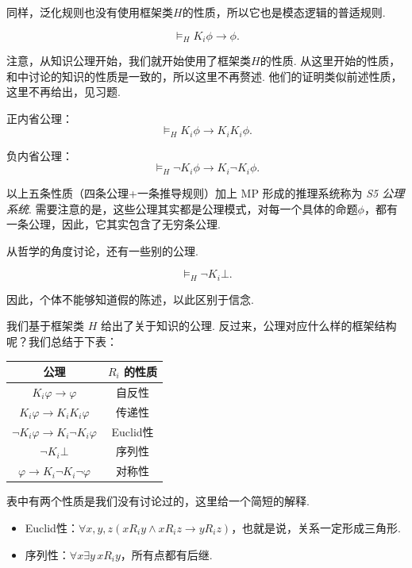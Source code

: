 同样，泛化规则也没有使用框架类$H$的性质，所以它也是模态逻辑的普适规则. 

\begin{proposition}
\[\vDash_H K_i\phi\to\phi.\]
\end{proposition}

注意，从知识公理开始，我们就开始使用了框架类$H$的性质. 从这里开始的性质，和中讨论的知识的性质是一致的，所以这里不再赘述. 他们的证明类似前述性质，这里不再给出，见习题. 

\begin{proposition}[内省公理]
正内省公理：
\[\vDash_H K_i\phi\to K_iK_i\phi.\]

负内省公理：
\[\vDash_H \neg K_i\phi\to K_i\neg K_i\phi.\]
\end{proposition}

以上五条性质（四条公理+一条推导规则）加上 MP 形成的推理系统称为 \emph{S5 公理系统}. 需要注意的是，这些公理其实都是公理模式，对每一个具体的命题$\phi$，都有一条公理，因此，它其实包含了无穷条公理. 

从哲学的角度讨论，还有一些别的公理. 

\begin{proposition}[一致性公理]
\[\vDash_H\neg K_i\bot.\]
\end{proposition}

因此，个体不能够知道假的陈述，以此区别于信念. 

我们基于框架类 $H$ 给出了关于知识的公理. 反过来，公理对应什么样的框架结构呢？我们总结于下表：

\begin{center}
    \begin{tabular}{cc}
        \toprule 公理 &  $R_i$ 的性质 \\
        \midrule $K_i \varphi \to \varphi$ & 自反性 \\
        $K_i \varphi \to K_i K_i \varphi$ & 传递性 \\
        $\neg K_i \varphi \to K_i \neg K_i \varphi$ & Euclid性 \\
        $\neg K_i\bot$  & 序列性\\
        $\varphi \to K_i \neg K_i \neg \varphi$ & 对称性 \\
        \bottomrule
    \end{tabular}
\end{center}

表中有两个性质是我们没有讨论过的，这里给一个简短的解释. 
\begin{itemize}
    \item Euclid性：$\forall x,y,z(xR_iy\wedge xR_iz\to yR_iz)$，也就是说，关系一定形成三角形. 
    \item 序列性：$\forall x\exists y\, xR_iy$，所有点都有后继. 
\end{itemize}

